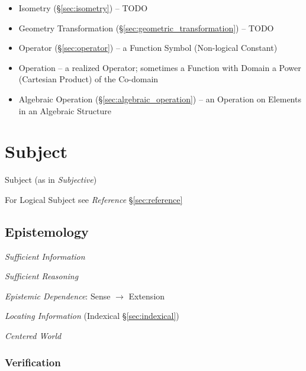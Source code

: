 \begin{itemize}
\begin{itemize}
    \end{itemize}
  \item Isometry (\S\ref{sec:isometry}) -- TODO
  \item Geometry Transformation (\S\ref{sec:geometric_transformation}) -- TODO
  \item Operator (\S\ref{sec:operator}) -- a Function Symbol (Non-logical
    Constant)
  \item Operation -- a realized Operator; sometimes a Function with Domain a
    Power (Cartesian Product) of the Co-domain
  \item Algebraic Operation (\S\ref{sec:algebraic_operation}) -- an Operation on
    Elements in an Algebraic Structure
\end{itemize}



\section{Subject}\label{sec:subject}

Subject (as in \emph{Subjective})

For Logical Subject see \emph{Reference} \S\ref{sec:reference}



\subsection{Epistemology}\label{sec:epistemology}
\cite{chalmers02}

\emph{Sufficient Information}

\emph{Sufficient Reasoning}

\emph{Epistemic Dependence}: Sense $\rightarrow$ Extension

\emph{Locating Information} (Indexical \S\ref{sec:indexical})

\emph{Centered World}



\subsubsection{Verification}\label{sec:verification}

